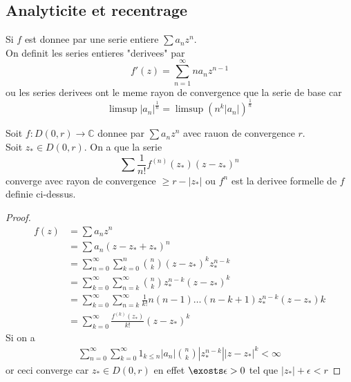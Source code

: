\documentclass[../main.tex]{subfiles}
\begin{document}
\subsection{Analyticite et recentrage}
\begin{defn}
	Si $f$ est donnee par une serie entiere $ \sum a_nz^{n}$.\\
	On definit les series entieres "derivees" par
	\[ 
		f'( z) = \sum_{n=1}^{ \infty } n a_n z^{n-1}
	\]
	ou les series derivees ont le meme rayon de convergence que la serie de base car
	\[ 
		\limsup |a_n|^{\frac{1}{n}}= \limsup ( n^{k}|a_n|)^{\frac{1}{n}}
	\]
		
\end{defn}
\begin{lemma}
	Soit $f: D( 0,r) \to \mathbb{C}$ donnee par $\sum a_n z^{n}$ avec rauon de convergence $r$.\\
	Soit $z_{\ast} \in D( 0,r) $. On a que la serie
	\[ 
		\sum \frac{1}{n!}f^{( n) }( z_\ast) ( z-z_{\ast} ) ^{n}	
	\]
	converge avec rayon de convergence $ \geq r- |z_{\ast} | $ ou $f^{n}$ est la derivee formelle de $f$ definie ci-dessus.
\end{lemma}
\begin{proof}
	\begin{align*}
		f( z) &= \sum a_n z^{n}\\
		      &= \sum a_n ( z-z_\ast + z_\ast) ^{n}\\
		      &= \sum_{n=0}^{ \infty }\sum_{k=0} ^{n}\binom n k ( z-z_\ast) ^{k}z_\ast^{n-k}\\
		      &= \sum_{k=0}^{ \infty } \sum_{n=k}^{ \infty }\binom n k z_{\ast} ^{n-k}( z-z_\ast) ^{k}\\
		      &= \sum_{k=0}^{ \infty } \sum_{n=k}^{ \infty } \frac{1}{k!} n ( n-1) \ldots ( n-k+1) z_{\ast} ^{n-k} ( z-z_{\ast} ) k\\
		      &= \sum_{k=0}^{ \infty } \frac{f^{( k) }( z_{\ast} ) }{k!}( z-z_{\ast} ) ^{k}
	\end{align*}
Si on a
\begin{align*}
\sum_{n=0}^{ \infty } \sum_{k=0}^{ \infty } 1_{k \leq n} |a_n| \binom n k |z_{\ast} ^{n-k}||z-z_{\ast} |^{k} < \infty 	
\end{align*}
or ceci converge car $z_{\ast} \in D( 0,r) $ en effet $\exosts \epsilon>0$ tel que $|z_{\ast} |+\epsilon<r$ 

\end{proof}
\end{document}
